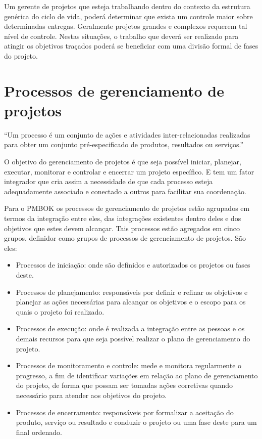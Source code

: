 \documentclass[12pt,a4paper,ruledheader,tocpage=prefix,floatnumber=continuous,pagestart=folhaderosto,font=times]{abnt}
\begin{document}
Um gerente de projetos que esteja trabalhando dentro do contexto da estrutura genérica do ciclo de vida, poderá determinar que exista um controle maior 
sobre determinadas entregas. Geralmente projetos grandes e complexos requerem tal nível de controle. Nestas situações, o trabalho que deverá ser realizado
para atingir os objetivos traçados poderá se beneficiar com uma divisão formal de fases do projeto.  

\section{Processos de gerenciamento de projetos}
``Um processo é um conjunto de ações e atividades inter-relacionadas
realizadas para obter um conjunto pré-especificado de produtos, resultados ou serviços\cite{PMBOK2008}.''

O objetivo do gerenciamento de projetos é que seja possível iniciar, planejar, executar, monitorar e controlar e encerrar um projeto específico. E tem um
fator integrador que cria assim a necessidade de que cada processo esteja adequadamente associado e conectado a outros para facilitar sua coordenação.

Para o PMBOK os processos de gerenciamento de projetos estão agrupados em termos da integração entre eles, das integrações existentes dentro deles e dos 
objetivos que estes devem alcançar. Tais processos estão agregados em cinco grupos, definidor como grupos de processos de gerenciamento de projetos. São eles:

\begin{itemize}
 \item Processos de iniciação: onde são definidos e autorizados os projetos ou fases deste.
 \item Processos de planejamento: responsáveis por definir e refinar os objetivos e planejar as ações necessárias para alcançar os objetivos e o escopo para
       os quais o projeto foi realizado.
 \item Processos de execução: onde é realizada a integração entre as pessoas e os demais recursos para que seja possível realizar o plano de gerenciamento do
       projeto.
 \item Processos de monitoramento e controle: mede e monitora regularmente o progresso, a fim de identificar variações em relação ao plano de gerenciamento do
       projeto, de forma que possam ser tomadas ações corretivas quando necessário para atender aos objetivos do projeto.
 \item Processos de encerramento: responsáveis por formalizar a aceitação do produto, serviço ou resultado e conduzir o projeto ou uma fase deste para um final
       ordenado.
\end{itemize}
\end{document}
